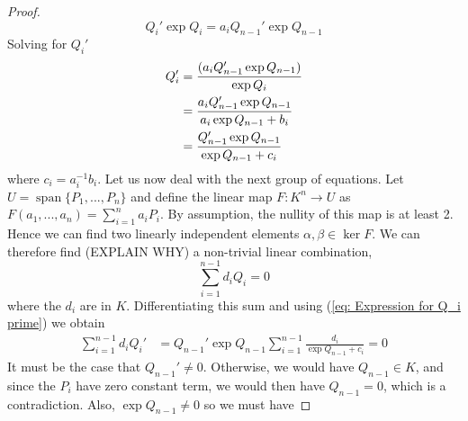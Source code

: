 \documentclass{article}
\newcommand{\Span}{\operatorname{span}}
\begin{document}
\begin{proof}
    $$Q_i' \exp Q_i = a_i Q_{n-1}' \exp Q_{n-1}$$
    Solving for $Q_i'$
    \begin{align}\label{eq: Expression for Q_i prime}
        Q_i' &= \frac{(a_i Q_{n-1}' \exp Q_{n-1})}{\exp Q_i} \notag \\
        &= \frac{a_i Q_{n-1}' \exp Q_{n-1}}{a_i \exp Q_{n-1} + b_i} \\
        &= \frac{Q_{n-1}' \exp Q_{n-1}}{\exp Q_{n-1} + c_i} \notag
    \end{align}
    where $c_i = a_i^{-1}b_i$. Let us now deal with the next group of equations. Let $U = \Span \{P_1, ..., P_n \}$ and define the linear map $F : K^n \to U$ as $F(a_1, ..., a_n) = \sum_{i=1}^n a_i P_i$. By assumption, the nullity of this map is at least 2. Hence we can find two linearly independent elements $\alpha, \beta \in \ker F$. We can therefore find (EXPLAIN WHY) a non-trivial linear combination,
    $$\sum_{i=1}^{n-1} d_i Q_i = 0$$
    where the $d_i$ are in $K$. Differentiating this sum and using (\ref{eq: Expression for Q_i prime}) we obtain
    \begin{align*}
        \sum_{i=1}^{n-1} d_i Q_i' &= Q_{n-1}' \exp Q_{n-1} \sum_{i=1}^{n-1} \frac{d_i}{\exp Q_{n-1} + c_i} = 0
    \end{align*}
    It must be the case that $Q_{n-1}' \neq 0$. Otherwise, we would have $Q_{n-1} \in K$, and since the $P_i$ have zero constant term, we would then have $Q_{n-1} = 0$, which is a contradiction. Also, $\exp Q_{n-1} \neq 0$ so we must have 
    

\end{proof}
\end{document}
